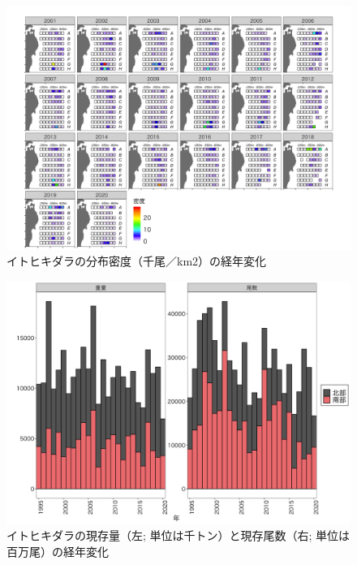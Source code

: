 \documentclass[11pt]{article} %
\begin{document}
\begin{linenumbers}
\begin{figure}[h]
  \centering
  \includegraphics[width = 14cm]{イトヒキダラdens.png}
  \caption{イトヒキダラの分布密度（千尾／km2）の経年変化}
\end{figure}

\begin{figure}[h]
  \centering
  \includegraphics[width = 14cm]{イトヒキダラtrend.png}
  \caption{イトヒキダラの現存量（左; 単位は千トン）と現存尾数（右; 単位は百万尾）の経年変化}
\end{figure}


\end{linenumbers}
\end{document}
